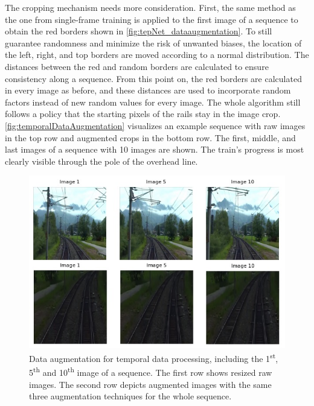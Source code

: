 The cropping mechanism needs more consideration.
First, the same method as the one from single-frame training is applied to the first image of a sequence to obtain the red borders shown in \autoref{fig:tepNet_dataaugmentation}.
To still guarantee randomness and minimize the risk of unwanted biases, the location of the left, right, and top borders are moved according to a normal distribution.
The distances between the red and random borders are calculated to ensure consistency along a sequence.
From this point on, the red borders are calculated in every image as before, and these distances are used to incorporate random factors instead of new random values for every image.
The whole algorithm still follows a policy that the starting pixels of the rails stay in the image crop.
\autoref{fig:temporalDataAugmentation} visualizes an example sequence with raw images in the top row and augmented crops in the bottom row.
The first, middle, and last images of a sequence with 10 images are shown.
The train's progress is most clearly visible through the pole of the overhead line. 

\begin{figure}[H]
    \centering
    \includegraphics[width=0.59\linewidth]{PICs//dataAugmentation/temporal_data_augmentation.jpg}
    \caption{Data augmentation for temporal data processing, including the 1\textsuperscript{st}, 5\textsuperscript{th} and 10\textsuperscript{th} image of a sequence. The first row shows resized raw images. The second row depicts augmented images with the same three augmentation techniques for the whole sequence.}
    \label{fig:temporalDataAugmentation}
\end{figure}
